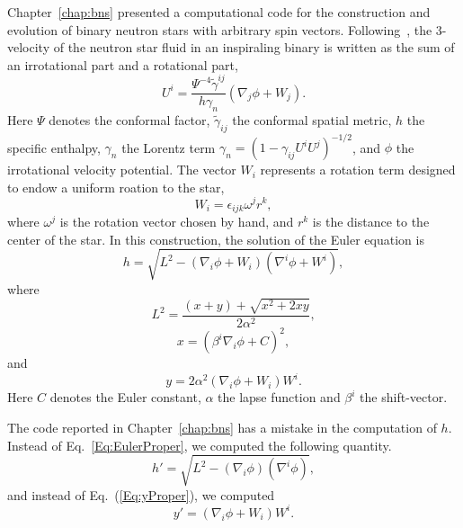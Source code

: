 \begin{subappendices}
Chapter~\ref{chap:bns} presented a computational code for the
construction and evolution of binary neutron stars with arbitrary spin
vectors.
%
Following~\citep{Tichy:2012rp},
the 3-velocity of the neutron star fluid in an inspiraling binary is
written as the sum of an irrotational part and a rotational part,
\begin{equation}
U^i =
\frac{\Psi^{-4}\tilde{\gamma}^{ij}}{h\gamma_n}\left(\nabla_j\phi +
  W_j\right).
\end{equation}
Here $\Psi$ denotes the conformal factor, $\tilde{\gamma}_{ij}$ the
conformal spatial metric, $h$ the specific enthalpy, $\gamma_n$ the
Lorentz term $\gamma_n=\left(1-\gamma_{ij}U^iU^j\right)^{-1/2}$,
and $\phi$ the irrotational velocity potential. The vector $W_i$ represents a rotation
term designed to endow a uniform roation to the star,
\begin{equation}
\label{Eq:WVector}
W_i=\epsilon_{ijk}\omega^{j}r^k,
\end{equation}
where $\omega^j$ is the rotation vector chosen by hand, and $r^k$ is
the distance to the center of the star.
In this
construction, the solution of the Euler equation is
\begin{equation}
\label{Eq:EulerProper}
h=\sqrt{L^2-\left(\nabla_i\phi+W_i\right)\left(\nabla^i\phi+W^i\right)},
\end{equation}
where
\begin{equation}
L^2 = \frac{(x+y)+\sqrt{x^2+2xy}}{2\alpha^2},
\end{equation}
\begin{equation}
x=\left(\beta^i\nabla_i\phi+C\right)^2,
\end{equation}
and
\begin{equation}
\label{Eq:yProper}
y=2\alpha^2\left(\nabla_i\phi+W_i\right)W^i.
\end{equation}
Here $C$ denotes the Euler constant, $\alpha$ the lapse function and $\beta^i$ the shift-vector.

The code reported in Chapter~\ref{chap:bns} has a mistake in the
computation of $h$.  Instead of Eq.~\ref{Eq:EulerProper}, we computed
the following quantity.
\begin{equation}
h'=\sqrt{L^2-\left(\nabla_i\phi\right)\left(\nabla^i\phi\right)},
\end{equation}
and instead of Eq.~(\ref{Eq:yProper}), we computed
\begin{equation}
y'=\left(\nabla_i\phi+W_i\right)W^i.
\end{equation}


\end{subappendices}
